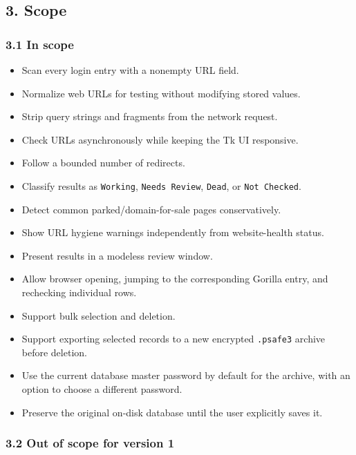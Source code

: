 \documentclass[
  letterpaper,
]{article}
\newcommand{\passthrough}[1]{#1}
\providecommand{\tightlist}{%
  \setlength{\itemsep}{0pt}\setlength{\parskip}{0pt}}
\begin{document}
\subsection{3. Scope}\label{3-scope}

\subsubsection{3.1 In scope}\label{31-in-scope}

\begin{itemize}
\tightlist
\item
  Scan every login entry with a nonempty URL field.
\item
  Normalize web URLs for testing without modifying stored values.
\item
  Strip query strings and fragments from the network request.
\item
  Check URLs asynchronously while keeping the Tk UI responsive.
\item
  Follow a bounded number of redirects.
\item
  Classify results as \passthrough{\lstinline!Working!}, \passthrough{\lstinline!Needs Review!},
  \passthrough{\lstinline!Dead!}, or \passthrough{\lstinline!Not Checked!}.
\item
  Detect common parked/domain-for-sale pages conservatively.
\item
  Show URL hygiene warnings independently from website-health status.
\item
  Present results in a modeless review window.
\item
  Allow browser opening, jumping to the corresponding Gorilla entry, and rechecking individual rows.
\item
  Support bulk selection and deletion.
\item
  Support exporting selected records to a new encrypted \passthrough{\lstinline!.psafe3!} archive before deletion.
\item
  Use the current database master password by default for the archive, with an option to choose a different password.
\item
  Preserve the original on-disk database until the user explicitly saves it.
\end{itemize}

\subsubsection{3.2 Out of scope for version 1}\label{32-out-of-scope-for-version-1}
\end{document}
